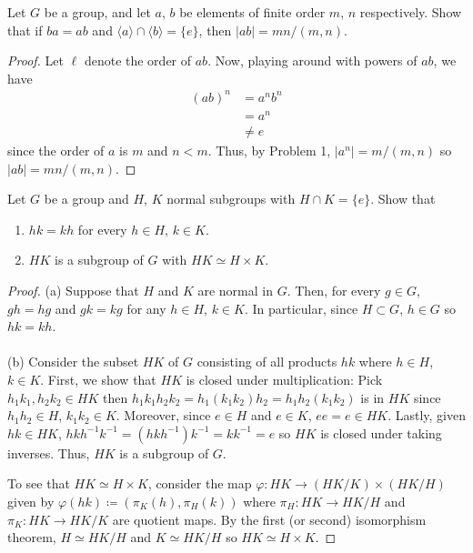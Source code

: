 \begin{problem}
  Let $G$ be a group, and let $a$, $b$ be elements of finite order $m$, $n$
  respectively. Show that if $ba=ab$ and
  $\langle a\rangle\cap\langle b\rangle=\{e\}$, then $|ab|=mn/(m,n)$.
\end{problem}
\begin{proof}
  Let $\ell$ denote the order of $ab$. Now, playing around with powers of
  $ab$, we have
  \begin{equation}
    \label{eq:1:4}
    \begin{aligned}
      (ab)^{n}
      &=a^nb^n\\
      &=a^n\\
      &\neq e
    \end{aligned}
  \end{equation}
  since the order of $a$ is $m$ and $n<m$. Thus, by Problem 1,
  $|a^n|=m/(m,n)$ so $|ab|=mn/(m,n)$.
\end{proof}

\begin{problem}
  Let $G$ be a group and $H$, $K$ normal subgroups with $H\cap
  K=\{e\}$. Show that
  \begin{enumerate}[label=(\alph*),noitemsep]
  \item $hk=kh$ for every $h\in H$, $k\in K$.
  \item $HK$ is a subgroup of $G$ with $HK\simeq H\times K$.
  \end{enumerate}
\end{problem}
\begin{proof}
  (a) Suppose that $H$ and $K$ are normal in $G$. Then, for every $g\in G$,
  $gh=hg$ and $gk=kg$ for any $h\in H$, $k\in K$. In particular, since
  $H\subset G$, $h\in G$ so $hk=kh$.
  \\\\
  (b) Consider the subset $HK$ of $G$ consisting of all products $hk$ where
  $h\in H$, $k\in K$. First, we show that $HK$ is closed under
  multiplication: Pick $h_1k_1,h_2k_2\in HK$ then
  $h_1k_1h_2k_2=h_1(k_1k_2)h_2=h_1h_2(k_1k_2)$ is in $HK$ since $h_1h_2\in
  H$, $k_1k_2\in K$. Moreover, since $e\in H$ and $e\in K$, $ee=e\in
  HK$. Lastly, given $hk\in HK$,
  $hkh^{-1}k^{-1}=(hkh^{-1})k^{-1}=kk^{-1}=e$ so $HK$ is closed under
  taking inverses. Thus, $HK$ is a subgroup of $G$.

  To see that $HK\simeq H\times K$, consider the map
  $\varphi\colon HK\to (HK/K)\times(HK/H)$ given by
  $\varphi(hk)\coloneq(\pi_K(h),\pi_H(k))$ where $\pi_H\colon HK\to HK/H$
  and $\pi_K\colon HK\to HK/K$ are quotient maps. By the first (or second)
  isomorphism theorem, $H\simeq HK/H$ and $K\simeq HK/H$ so $HK\simeq
  H\times K$.
\end{proof}

